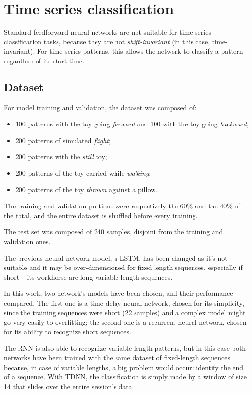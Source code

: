 \section{Time series classification}
Standard feedforward neural networks are not suitable for time series classification tasks, because they are not \textit{shift-invariant} (in this case, time-invariant). For time series patterns, this allows the network to classify a pattern regardless of its start time.
\bigbreak

\subsection{Dataset}
For model training and validation, the dataset was composed of:
\begin{itemize}
	\item 100 patterns with the toy going \textit{forward} and 100 with the toy going \textit{backward};
	\item 200 patterns of simulated \textit{flight};
	\item 200 patterns with the \textit{still} toy;
	\item 200 patterns of the toy carried while \textit{walking};
	\item 200 patterns of the toy \textit{thrown} against a pillow.
\end{itemize}
The training and validation portions were respectively the 60\% and the 40\% of the total, and the entire dataset is shuffled before every training.

The test set was composed of 240 samples, disjoint from the training and validation ones.
\bigbreak

The previous neural network model, a LSTM, has been changed as it's not suitable and it may be over-dimensioned for fixed length sequences, especially if short – its workhorse are long variable-length sequences.
\bigbreak

In this work, two network's models have been chosen, and their performance compared. The first one is a time delay neural network, chosen for its simplicity, since the training sequences were short (22 samples) and a complex model might go very easily to overfitting; the second one is a recurrent neural network, chosen for its ability to recognize short sequences.

The RNN is also able to recognize variable-length patterns, but in this case both networks have been trained with the same dataset of fixed-length sequences because, in case of variable lengths, a big problem would occur: identify the end of a sequence. With TDNN, the classification is simply made by a window of size 14 that slides over the entire session's data.

